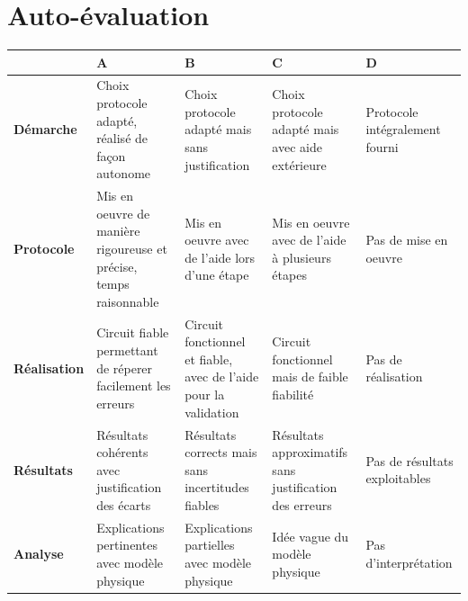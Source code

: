 
\section{Auto-évaluation}

\begin{center}
\begin{tabular}{|p{2.7cm}|>{\centering\arraybackslash}p{3.2cm}|>{\centering\arraybackslash}p{3.2cm}|>{\centering\arraybackslash}p{3.2cm}|>{\centering\arraybackslash}p{3.2cm}|}
  \hline
   & \textbf{A} & \textbf{B} & \textbf{C} & \textbf{D} \\
  \hline
  \textbf{Démarche} & Choix protocole adapté, réalisé de façon autonome  & Choix protocole adapté mais sans justification & Choix protocole adapté mais avec aide extérieure & Protocole intégralement fourni \\
  \hline
  
  \textbf{Protocole} & Mis en oeuvre de manière rigoureuse et précise, temps raisonnable & Mis en oeuvre avec de l'aide lors d'une étape & Mis en oeuvre avec de l'aide à plusieurs étapes & Pas de mise en oeuvre \\
  \hline
  
  \textbf{Réalisation} & Circuit fiable permettant de réperer facilement les erreurs & Circuit fonctionnel et fiable, avec de l'aide pour la validation & Circuit fonctionnel mais de faible fiabilité & Pas de réalisation \\
  \hline
  
  \textbf{Résultats} & Résultats cohérents avec justification des écarts & Résultats corrects mais sans incertitudes fiables & Résultats approximatifs sans justification des erreurs & Pas de résultats exploitables \\
  \hline
  
  \textbf{Analyse} & Explications pertinentes avec modèle physique & Explications partielles avec modèle physique & Idée vague du modèle physique & Pas d'interprétation \\
  \hline
\end{tabular}
\end{center}


